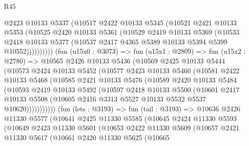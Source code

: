 \begin{lexlean}{R45}
\begin{coremodule}
                @2423
                @10133
                @5337
                (@10517
                  @2422
                  @10133
                  @5345
                  (@10521
                    @2421
                    @10133
                    @5353
                    (@10525
                      @2420
                      @10133
                      @5361
                      (@10529
                        @2419
                        @10133
                        @5369
                        (@10533
                          @2418
                          @10133
                          @5377
                          (@10537 @2417 @4365 @5389 @10133 @5394 @5399 @10552))))))))))
        (fun (u15x0 : @3073) =>
        fun (u15x1 : @2809) =>
        fun (u15x2 : @2780) =>
        @10565
          @2426
          @10133
          @5436
          (@10569
            @2425
            @10133
            @5444
            (@10573
              @2424
              @10133
              @5452
              (@10577
                @2423
                @10133
                @5460
                (@10581
                  @2422
                  @10133
                  @5468
                  (@10585
                    @2421
                    @10133
                    @5476
                    (@10589
                      @2420
                      @10133
                      @5484
                      (@10593
                        @2419
                        @10133
                        @5492
                        (@10597
                          @2418
                          @10133
                          @5500
                          (@10601
                            @2417
                            @10133
                            @5508
                            (@10605 @2416 @3313 @5527 @10133 @5532 @5537 @10620)))))))))))
        (fun (lets : @3193) =>
        fun (tail : @3193) =>
        @10636
          @2426
          @11330
          @5577
          (@10641
            @2425
            @11330
            @5585
            (@10645
              @2424
              @11330
              @5593
              (@10649
                @2423
                @11330
                @5601
                (@10653
                  @2422
                  @11330
                  @5609
                  (@10657
                    @2421
                    @11330
                    @5617
                    (@10661
                      @2420
                      @11330
                      @5625
                      (@10665

\end{coremodule}
\end{lexlean}
